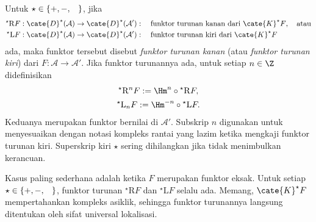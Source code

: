 \begin{definisi}\label{def:derived-functor}
	 
	Untuk $\star\in\{+,-,\hspace{0.8em}\}$, jika
	\begin{align*}
		{}^\star \mathrm{R}F: \cate{D}^\star(\mathcal{A}) & \to \cate{D}^\star(\mathcal{A}'): \quad \text{funktor turunan kanan dari $\cate{K}^\star F$}, \quad \text{atau} \\
		{}^\star \mathrm{L}F: \cate{D}^\star(\mathcal{A}) & \to \cate{D}^\star(\mathcal{A}'): \quad \text{funktor turunan kiri dari $\cate{K}^\star F$}
	\end{align*}
	ada, maka funktor tersebut disebut \emph{funktor turunan kanan} (atau
	\emph{funktor turunan kiri}) dari $F:\mathcal{A}\to\mathcal{A}'$. Jika
	funktor turunannya ada, untuk setiap $n\in\Z$ didefinisikan
	\begin{gather*}
		{}^\star \mathrm{R}^n F := \Hm^n \circ {}^\star \mathrm{R}F, \\
		{}^\star \mathrm{L}_n F := \Hm^{-n} \circ {}^\star \mathrm{L}F.
	\end{gather*}
	Keduanya merupakan funktor bernilai di $\mathcal{A}'$. Subskrip $n$
	digunakan untuk menyesuaikan dengan notasi kompleks rantai yang lazim ketika
	mengkaji funktor turunan kiri. Superskrip kiri $\star$ sering dihilangkan
	jika tidak menimbulkan kerancuan.
\end{definisi}

\begin{contoh}
	Kasus paling sederhana adalah ketika $F$ merupakan funktor eksak. Untuk
	setiap $\star\in\{+,-,\hspace{0.8em}\}$, funktor turunan
	${}^\star\mathrm{R}F$ dan ${}^\star\mathrm{L}F$ selalu ada. Memang,
	$\cate{K}^\star F$ mempertahankan kompleks asiklik, sehingga funktor
	turunannya langsung ditentukan oleh sifat universal lokalisasi.
\end{contoh}

